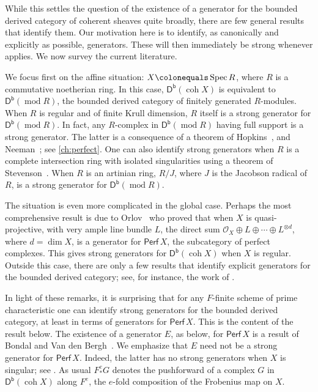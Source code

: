\documentclass{amsart}
\newcommand{\perf}[1]{\mathsf{Perf}\,#1}
\newcommand{\coh}{\operatorname{coh}}
\newcommand{\dbcat}[1]{\cat{D}^{\mathsf{b}}(#1)}
\newcommand{\mco}{\mathcal{O}}
\newcommand{\cat}[1]{{\mathsf{#1}}}
\newcommand{\rmod}{\operatorname{mod}}
\newcommand{\spec}{\operatorname{Spec}}
\theoremstyle{definition}
\theoremstyle{remark}
\numberwithin{equation}{subsection}
\begin{document}
While this settles the question of the existence of a generator 
for the bounded derived category of coherent sheaves quite broadly, there are few general results that identify them. Our motivation here is to identify, as canonically and explicitly as possible, generators. These 
will then immediately be strong whenever \cite{Aoki:2021} applies. We now
survey the current literature. 

We focus first on the affine situation: $X\colonequals \spec R$, where $R$ is a commutative noetherian ring. In this case, $\dbcat{\coh X}$ is equivalent to $\dbcat{\rmod R}$, the bounded derived category of finitely generated $R$-modules. When $R$ is regular and of finite Krull dimension, $R$ itself is a strong generator for $\dbcat{\rmod R}$. In fact, any $R$-complex in $\dbcat{\rmod R}$ having full support is a strong generator. The latter is a consequence of a theorem of Hopkins~\cite{Hopkins:1987}, and Neeman~\cite{Neeman:1992b}; see \cref{ch:perfect}. One can also identify strong generators when $R$ is a complete intersection ring with isolated singularities using a theorem of Stevenson~\cite{Stevenson:2014a}. When $R$ is an artinian ring, $R/J$, where $J$ is the Jacobson radical of $R$, is a strong generator for $\dbcat{\rmod R}$. 

The situation is even more complicated in the global case. Perhaps the most comprehensive result is due to Orlov~\cite{Orlov:2009} who proved that when $X$ is quasi-projective, with very ample line bundle $L$, the direct sum $\mco_X \oplus L\oplus \cdots \oplus L^{\otimes d}$, where $d=\dim X$, is a generator for $\perf{X}$, the subcategory of perfect complexes. This gives strong generators for $\dbcat{\coh X}$ when $X$ is regular. Outside this case, there are only a few results that identify explicit generators for the bounded derived category; see, for instance, the work of \cite{Ohkawa/Uehara:2013}.

In light of these remarks, it is surprising that for any $F$-finite scheme of prime characteristic one can identify strong generators for the bounded derived category, at least in terms of generators for $\perf X$. This is the content of the result below. The existence of a generator $E$, as below, for $\perf X$ is a result of Bondal and Van den Bergh~\cite[Theorem~3.1.1]{Bondal/VanDenBergh:2003}.  We emphasize that $E$ need not be a strong generator for $\perf X$. Indeed, the latter has no strong generators when $X$ is singular; see \cite{Rouquier:2008,Oppermann/Stovicek:2012}.
As usual $F^e_*G$ denotes the pushforward of a complex $G$ in $\dbcat{\coh X}$ along $F^e$, the $e$-fold composition of the Frobenius map on $X$. 
\end{document}
